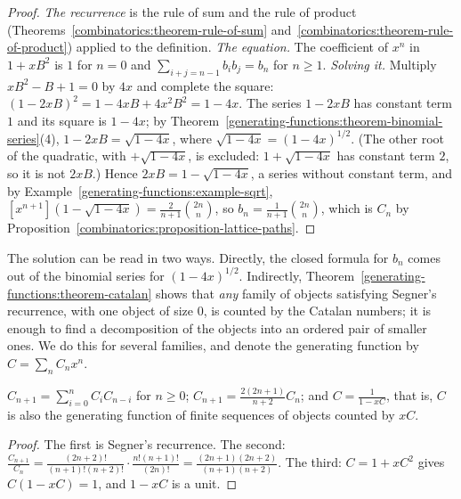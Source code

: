 \begin{proof}
\emph{The recurrence} is the rule of sum and the rule of product (Theorems~\ref{combinatorics:theorem-rule-of-sum} and~\ref{combinatorics:theorem-rule-of-product}) applied to the definition.
\emph{The equation.} The coefficient of $x^n$ in $1 + xB^2$ is $1$ for $n = 0$ and $\sum_{i+j=n-1}b_ib_j = b_n$ for $n \geq 1$.
\emph{Solving it.} Multiply $xB^2 - B + 1 = 0$ by $4x$ and complete the square: $(1 - 2xB)^2 = 1 - 4xB + 4x^2B^2 = 1 - 4x$. The series $1 - 2xB$ has constant term $1$ and its square is $1 - 4x$;
by Theorem~\ref{generating-functions:theorem-binomial-series}(4), $1 - 2xB = \sqrt{1 - 4x}$, where $\sqrt{1 - 4x} = (1 - 4x)^{1/2}$. (The other root of the quadratic, with $+\sqrt{1 - 4x}$, is excluded:
$1 + \sqrt{1 - 4x}$ has constant term $2$, so it is not $2xB$.) Hence $2xB = 1 - \sqrt{1 - 4x}$, a series without constant term, and by Example~\ref{generating-functions:example-sqrt},
$[x^{n+1}](1 - \sqrt{1 - 4x}) = \frac{2}{n + 1}\binom{2n}{n}$, so $b_n = \frac{1}{n + 1}\binom{2n}{n}$, which is $C_n$ by Proposition~\ref{combinatorics:proposition-lattice-paths}.
\end{proof}

The solution can be read in two ways. Directly, the closed formula for $b_n$ comes out of the binomial series for $(1 - 4x)^{1/2}$. Indirectly, Theorem~\ref{generating-functions:theorem-catalan}
shows that \emph{any} family of objects satisfying Segner's recurrence, with one object of size $0$, is counted by the Catalan numbers; it is enough to find a decomposition of the objects into an
ordered pair of smaller ones. We do this for several families, and denote the generating function by $C = \sum_nC_nx^n$.

\begin{corollary}\label{generating-functions:corollary-catalan-recurrence}
$C_{n+1} = \sum_{i=0}^{n}C_iC_{n-i}$ for $n \geq 0$; $C_{n+1} = \frac{2(2n + 1)}{n + 2}C_n$; and $C = \frac{1}{1 - xC}$, that is, $C$ is also the generating function of finite sequences of objects
counted by $xC$.
\end{corollary}

\begin{proof}
The first is Segner's recurrence. The second: $\frac{C_{n+1}}{C_n} = \frac{(2n + 2)!}{(n + 1)!(n + 2)!} \cdot \frac{n!(n + 1)!}{(2n)!} = \frac{(2n + 1)(2n + 2)}{(n + 1)(n + 2)}$. The third: $C = 1 + xC^2$
gives $C(1 - xC) = 1$, and $1 - xC$ is a unit.
\end{proof}

